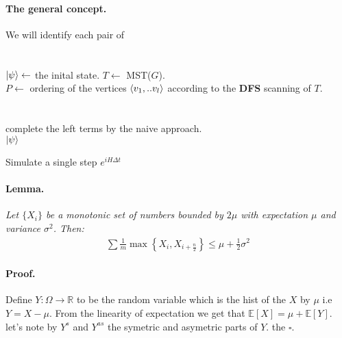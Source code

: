 \documentclass{article}
\begin{document}
\begin{multicols*}{2}
\paragraph{The general concept.} We will identify each pair of  


\paragraph{}

\begin{algorithm}[H]
\SetAlgoLined
\ \\ 
\( \ket{\psi} \leftarrow \) the inital state.
 \(T  \leftarrow\) MST(\(G\)). \\
 \(P \leftarrow \) ordering of the vertices \( \braket{v_{1} , .. v_{l}}\) according to the \textbf{DFS} scanning of \(T\). \\
 \ \\ 
 \ \\
 complete the left terms by the naive approach. \\
 \Return \( \ket{\psi} \)
 \caption{Simulate a single step \(e^{iH\Delta t}\)}
\end{algorithm}


\paragraph{Lemma.} \textit{Let \(\{X_{i}\}\) be a monotonic set of numbers bounded by \(2\mu\) with expectation \( \mu \) and variance \( \sigma^2 \). Then:}
\begin{equation*}
    \begin{split}
        \sum{ \frac{1}{m}\max{ \left\{ X_{i}, X_{i+ \frac{n}{2}} \right\} } } \le \mu + \frac{1}{2}\sigma^2  
    \end{split}
\end{equation*}
\paragraph{Proof.} Define \(Y : \Omega \rightarrow \mathbb{R} \) to be the random  variable which is the hist of the \(X\) by \(\mu\) i.e \(Y = X -\mu\). From the linearity of expectation we get that \(\mathbb{E}[X] = \mu + \mathbb{E}[Y]\). let's note by \(Y^{s}\) and \(Y^{as}\) the symetric and asymetric parts of \(Y\). the \(\square\). 


\end{multicols*}
\end{document}
